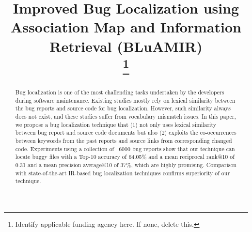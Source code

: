 \documentclass[conference]{IEEEtran}
\begin{document}
\title{Improved Bug Localization using Association Map and Information Retrieval (BLuAMIR)\\
\thanks{Identify applicable funding agency here. If none, delete this.}
}

\author{

}

\maketitle

\begin{abstract}
Bug localization is one of the most challending tasks undertaken by the developers during software maintenance.
Existing studies mostly rely on lexical similarity between the bug reports and source code for bug localization.
However, such similarity always does not exist, and these studies suffer from vocabulary mismatch issues.
In this paper, we propose a bug localization technique that (1) not only uses lexical similarity between bug report and source code documents  
but also (2) exploits the co-occurrences between keywords from the past reports and source links from corresponding changed code.
Experiments using a collection of ~6000 bug reports show that our technique can locate buggy files with a Top-10 accuracy of 64.05\% and a mean reciprocal rank@10 of 0.31 and a mean precision average@10 of 37\%, which are highly promising. 
Comparison with state-of-the-art IR-based bug localization techniques confirms superiority of our technique. 
\end{abstract}
\end{document}
